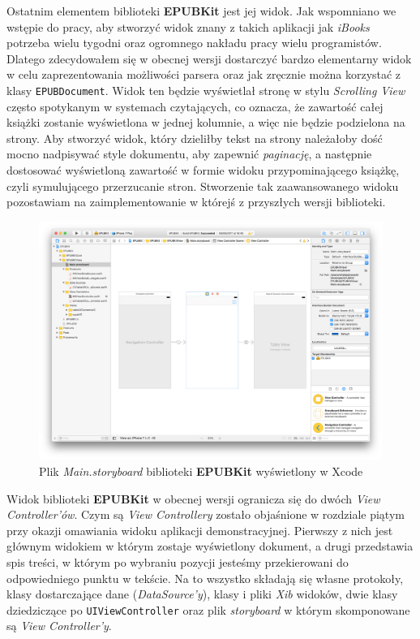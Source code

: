 Ostatnim elementem biblioteki \textbf{EPUBKit} jest jej widok. Jak wspomniano we wstępie do pracy, aby stworzyć widok znany z takich aplikacji jak \textit{iBooks} potrzeba wielu tygodni oraz ogromnego nakładu pracy wielu programistów. Dlatego zdecydowałem się w obecnej wersji dostarczyć bardzo elementarny widok w celu zaprezentowania możliwości parsera oraz jak zręcznie można korzystać z klasy \texttt{EPUBDocument}. Widok ten będzie wyświetlał stronę w stylu \textit{Scrolling View} często spotykanym w systemach czytających, co oznacza, że zawartość całej książki zostanie wyświetlona w jednej kolumnie, a więc nie będzie podzielona na strony. Aby stworzyć widok, który dzieliłby tekst na strony należałoby dość mocno nadpisywać style dokumentu, aby zapewnić \textit{paginację}, a następnie dostosować wyświetloną zawartość w formie widoku przypominającego książkę, czyli symulującego przerzucanie stron. Stworzenie tak zaawansowanego widoku pozostawiam na zaimplementowanie w którejś z przyszłych wersji biblioteki.

\begin{figure}[ht!]
  \centering
  \includegraphics[width=120mm]{images/chapter-4-image-3-epubkit-storyboard.png}
  \caption{Plik \textit{Main.storyboard} biblioteki \textbf{EPUBKit} wyświetlony w Xcode}
  \label{chapter-4-image-3-epubkit-storyboard}
\end{figure}

Widok biblioteki \textbf{EPUBKit} w obecnej wersji ogranicza się do dwóch \textit{View Controller’ów}. Czym są \textit{View Controllery} zostało objaśnione w rozdziale piątym przy okazji omawiania widoku aplikacji demonstracyjnej. Pierwszy z nich jest głównym widokiem w którym zostaje wyświetlony dokument, a drugi przedstawia spis treści, w którym po wybraniu pozycji jesteśmy przekierowani do odpowiedniego punktu w tekście. Na to wszystko składają się własne protokoły, klasy dostarczające dane (\textit{DataSource'y}), klasy i pliki \textit{Xib} widoków, dwie klasy dziedziczące po \texttt{UIViewController} oraz plik \textit{storyboard} w którym skomponowane są \textit{View Controller’y}.


